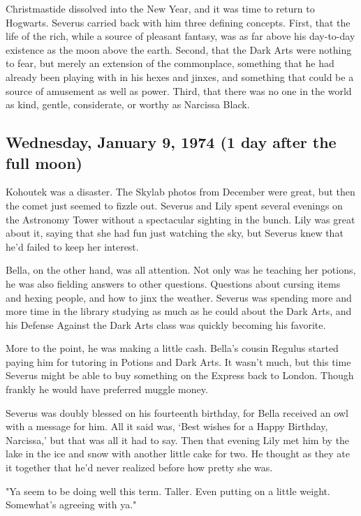 Christmastide dissolved into the New Year, and it was time to return to Hogwarts. Severus carried back with him three defining concepts. First, that the life of the rich, while a source of pleasant fantasy, was as far above his day-to-day existence as the moon above the earth. Second, that the Dark Arts were nothing to fear, but merely an extension of the commonplace, something that he had already been playing with in his hexes and jinxes, and something that could be a source of amusement as well as power. Third, that there was no one in the world as kind, gentle, considerate, or worthy as Narcissa Black.

\subsection{Wednesday, January 9, 1974 (1 day after the full moon)}

Kohoutek was a disaster. The Skylab photos from December were great, but then the comet just seemed to fizzle out. Severus and Lily spent several evenings on the Astronomy Tower without a spectacular sighting in the bunch. Lily was great about it, saying that she had fun just watching the sky, but Severus knew that he'd failed to keep her interest.

Bella, on the other hand, was all attention. Not only was he teaching her potions, he was also fielding answers to other questions. Questions about cursing items and hexing people, and how to jinx the weather. Severus was spending more and more time in the library studying as much as he could about the Dark Arts, and his Defense Against the Dark Arts class was quickly becoming his favorite.

More to the point, he was making a little cash. Bella's cousin Regulus started paying him for tutoring in Potions and Dark Arts. It wasn't much, but this time Severus might be able to buy something on the Express back to London. Though frankly he would have preferred muggle money.

Severus was doubly blessed on his fourteenth birthday, for Bella received an owl with a message for him. All it said was, `Best wishes for a Happy Birthday, Narcissa,' but that was all it had to say. Then that evening Lily met him by the lake in the ice and snow with another little cake for two. He thought as they ate it together that he'd never realized before how pretty she was.

"Ya seem to be doing well this term. Taller. Even putting on a little weight. Somewhat's agreeing with ya."


